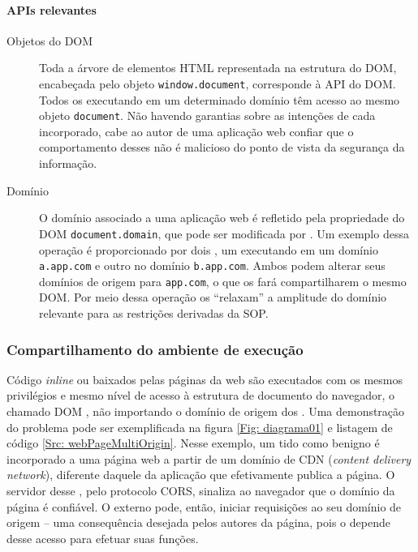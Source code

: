 \paragraph{APIs relevantes} %
\label{par:apis_relevantes}

\begin{description}
	\item[Objetos do DOM ] Toda a árvore de elementos HTML representada na estrutura do DOM, encabeçada pelo objeto \texttt{window.document}, corresponde à API  do DOM. Todos os \scripts{} executando em um determinado domínio têm acesso ao mesmo objeto \texttt{document}. Não havendo garantias sobre as intenções de cada \script{} incorporado, cabe ao autor de uma aplicação web confiar que o comportamento desses \scripts{} não é malicioso do ponto de vista da segurança da informação.
	\item[Domínio] O domínio associado a uma aplicação web é refletido pela propriedade do DOM \texttt{document.domain}, que pode ser modificada por \scripts{}. Um exemplo dessa operação é proporcionado por dois \scripts{}, um executando em um domínio \texttt{a.app.com} e outro no domínio \texttt{b.app.com}. Ambos podem alterar seus domínios de origem para \texttt{app.com}, o que os fará compartilharem o mesmo DOM. Por meio dessa operação os \scripts{} ``relaxam'' a amplitude do domínio relevante para as restrições derivadas da SOP.
\end{description}



\subsubsection{Compartilhamento do ambiente de execução}
Código \textit{inline} ou {\scripts} baixados pelas páginas da web são executados com os mesmos privilégios e mesmo nível de acesso à estrutura de documento do navegador, o chamado DOM \cite[p. 2-3]{DeRyck2012}, não importando o domínio de origem dos {\scripts}. Uma demonstração do problema pode ser exemplificada na figura \ref{Fig: diagrama01} e listagem de código \ref{Src: webPageMultiOrigin}. Nesse exemplo, um {\script} tido como benigno é incorporado a uma página web a partir de um domínio de CDN (\textit{content delivery network}), diferente daquele da aplicação que efetivamente publica a página. O servidor desse {\script}, pelo protocolo CORS, sinaliza ao navegador que o domínio da página é confiável. O {\script} externo pode, então, iniciar requisições ao seu domínio de origem -- uma consequência desejada pelos autores da página, pois o {\script} depende desse acesso para efetuar suas funções.

